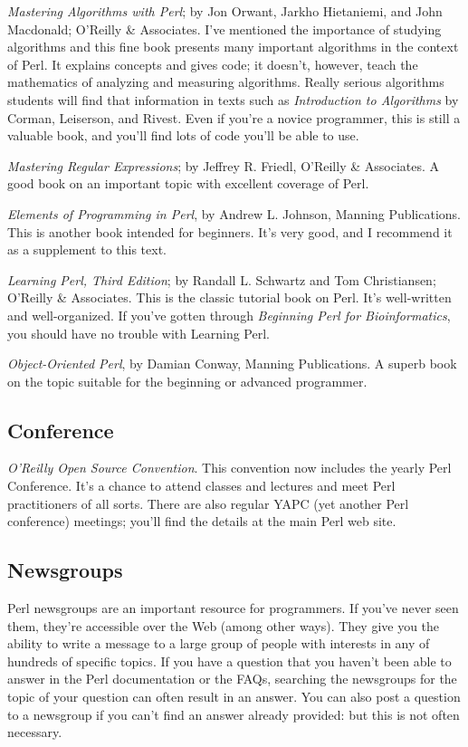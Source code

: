 \textit{Mastering Algorithms with Perl}; by Jon Orwant, Jarkho Hietaniemi, and John Macdonald; O'Reilly \& Associates. I've mentioned the importance of studying algorithms and this fine book presents many important algorithms in the context of Perl. It explains concepts and gives code; it doesn't, however, teach the mathematics of analyzing and measuring algorithms. Really serious algorithms students will find that information in texts such as \textit{Introduction to Algorithms} by Corman, Leiserson, and Rivest. Even if you're a novice programmer, this is still a valuable book, and you'll find lots of code you'll be able to use.

\textit{Mastering Regular Expressions}; by Jeffrey R. Friedl, O'Reilly \& Associates. A good book on an important topic with excellent coverage of Perl.

\textit{Elements of Programming in Perl}, by Andrew L. Johnson, Manning Publications. This is another book intended for beginners. It's very good, and I recommend it as a supplement to this text.

\textit{Learning Perl, Third Edition}; by Randall L. Schwartz and Tom Christiansen; O'Reilly \& Associates. This is the classic tutorial book on Perl. It's well-written and well-organized. If you've gotten through \textit{Beginning Perl for Bioinformatics}, you should have no trouble with Learning Perl.

\textit{Object-Oriented Perl}, by Damian Conway, Manning Publications. A superb book on the topic suitable for the beginning or advanced programmer.

\subsection{Conference}
\textit{O'Reilly Open Source Convention}. This convention now includes the yearly Perl Conference. It's a chance to attend classes and lectures and meet Perl practitioners of all sorts. There are also regular YAPC (yet another Perl conference) meetings; you'll find the details at the main Perl web site.

\subsection{Newsgroups}
Perl newsgroups are an important resource for programmers. If you've never seen them, they're accessible over the Web (among other ways). They give you the ability to write a message to a large group of people with interests in any of hundreds of specific topics. If you have a question that you haven't been able to answer in the Perl documentation or the FAQs, searching the newsgroups for the topic of your question can often result in an answer. You can also post a question to a newsgroup if you can't find an answer already provided: but this is not often necessary.

